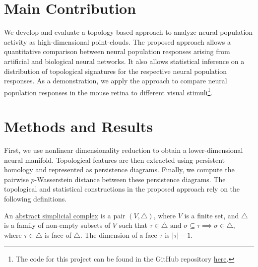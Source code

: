 \documentclass[9pt,conference]{IEEEtran}
\begin{document}
\section{Main Contribution}
We develop and evaluate a topology-based approach to analyze neural population activity as high-dimensional point-clouds. The proposed approach allows a quantitative comparison between neural population responses arising from artificial and biological neural networks. It also allows statistical inference on a distribution of topological signatures for the respective neural population responses. As a demonstration, we apply the approach to compare neural population responses in the mouse retina to different visual stimuli\footnote{The code for this project can be found in the GitHub repository \href{https://github.com/zhang-liu-official/UROPS-2021-Topological-Data-Analysis}{here}.}.
\section{Methods and Results}
First, we use nonlinear dimensionality reduction to obtain a lower-dimensional neural manifold. Topological features are then extracted using persistent homology and represented as persistence diagrams. Finally, we compute the pairwise $p$-Wasserstein distance between these persistence diagrams. The topological and statistical constructions in the proposed approach rely on the following definitions. 
\begin{defn}
An \underline{abstract simplicial complex} is a pair $(V, \triangle)$, where $V$ is a finite set, and $\triangle$ is a family of non-empty subsets of $V$ such that $\tau \in \triangle \text{ and }\sigma \subseteq \tau \implies \sigma \in \triangle,$ where $\tau \in \triangle $ is face of $\triangle$. The dimension of a face $\tau$ is $|\tau| - 1.$ 
\end{defn}
\end{document}
